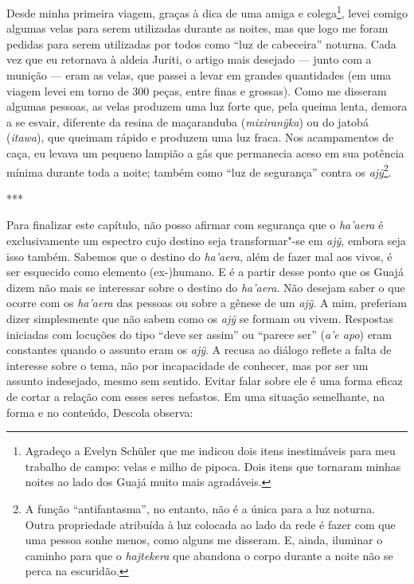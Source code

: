 Desde minha primeira viagem, graças à dica de uma amiga e
colega\footnote{Agradeço a Evelyn Schüler que me indicou dois itens
  inestimáveis para meu trabalho de campo: velas e milho de pipoca. Dois
  itens que tornaram minhas noites ao lado dos Guajá muito mais
  agradáveis.}, levei comigo algumas velas para serem utilizadas durante
as noites, mas que logo me foram pedidas para serem utilizadas por todos
como ``luz de cabeceira'' noturna. Cada vez que eu retornava à aldeia
Juriti, o artigo mais desejado --- junto com a munição --- eram as velas,
que passei a levar em grandes quantidades (em uma viagem levei em torno
de 300 peças, entre finas e grossas). Como me disseram algumas pessoas,
as velas produzem uma luz forte que, pela queima lenta, demora a se
esvair, diferente da resina de maçaranduba (\emph{mixiranỹka}) ou do
jatobá (\emph{itawa}), que queimam rápido e produzem uma luz fraca. Nos
acampamentos de caça, eu levava um pequeno lampião a gás que permanecia
aceso em sua potência mínima durante toda a noite; também como ``luz de
segurança'' contra os \emph{ajỹ}\footnote{A função ``antifantasma'', no
  entanto, não é a única para a luz noturna. Outra propriedade atribuída
  à luz colocada ao lado da rede é fazer com que uma pessoa sonhe menos,
  como alguns me disseram. E, ainda, iluminar o caminho para que o
  \emph{hajtekera} que abandona o corpo durante a noite não se perca na
  escuridão.}.

\begin{center}
***
\end{center}

Para finalizar este capítulo, não posso afirmar com segurança que o
\emph{ha'aera} é exclusivamente um espectro cujo destino seja
transformar"-se em \emph{ajỹ}, embora seja isso também. Sabemos que o
destino do \emph{ha'aera}, além de fazer mal aos vivos, é ser esquecido
como elemento (ex-)humano. E é a partir desse ponto que os Guajá dizem
não mais se interessar sobre o destino do \emph{ha'aera}. Não desejam
saber o que ocorre com os \emph{ha'aera} das pessoas ou sobre a gênese
de um \emph{ajỹ}. A mim, preferiam dizer simplesmente que não sabem como
os \emph{ajỹ} se formam ou vivem. Respostas iniciadas com locuções do
tipo ``deve ser assim'' ou ``parece ser'' (\emph{a'e apo}) eram constantes
quando o assunto eram os \emph{ajỹ}. A recusa ao diálogo reflete a falta
de interesse sobre o tema, não por incapacidade de conhecer, mas por ser
um assunto indesejado, mesmo sem sentido. Evitar falar sobre ele é uma
forma eficaz de cortar a relação com esses seres nefastos. Em uma
situação semelhante, na forma e no conteúdo, Descola observa:

